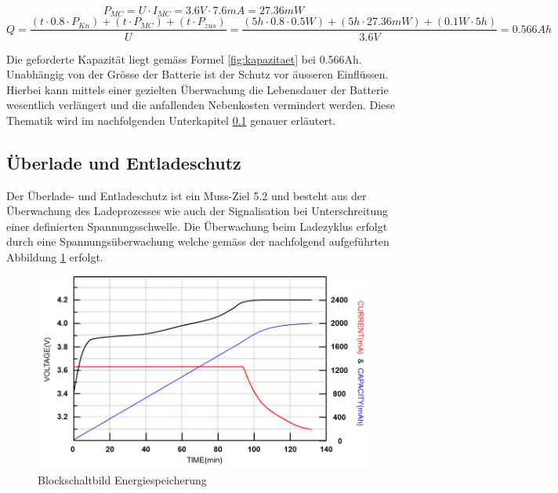 \begin{equation}
P_{MC}=U\cdot I_{MC}=3.6V\cdot 7.6mA=27.36mW
\label{fig:LeistungMC}
\end{equation}
\begin{equation}
Q=\frac{\left(t\cdot 0.8\cdot P_{Kn}\right)+\left(t\cdot P_{MC}\right)+(t\cdot P_{zus})}{U}=\frac{\left(5h\cdot 0.8\cdot 0.5W\right)+\left(5h\cdot 27.36mW\right)+(0.1W\cdot 5h)}{3.6V}=0.566Ah
\label{fig:kapazitaet}
\end{equation}

Die geforderte Kapazität liegt gemäss Formel \ref{fig:kapazitaet} bei 0.566Ah. Unabhängig von der Grösse der Batterie ist der Schutz vor äusseren Einflüssen. Hierbei kann mittels einer gezielten Überwachung die Lebensdauer der Batterie wesentlich verlängert und die anfallenden Nebenkosten vermindert werden. Diese Thematik wird im nachfolgenden Unterkapitel \ref{Überlade und Entladeschutz} genauer erläutert.
                                         
\subsection{Überlade und Entladeschutz}  \label{Überlade und Entladeschutz}

Der Überlade- und Entladeschutz ist ein Muss-Ziel 5.2 und besteht aus der Überwachung des Ladeprozesses wie auch der Signalisation bei Unterschreitung einer definierten Spannungsschwelle. Die Überwachung beim Ladezyklus erfolgt durch eine Spannungsüberwachung welche gemäss der nachfolgend aufgeführten Abbildung \ref{fig:Ladekurve Li-Ion Akku} erfolgt.

\begin{figure}[H]
	\begin{center}
		\includegraphics[width=120mm]{data/LadekurveLiIon.png}
		\caption{Blockschaltbild Energiespeicherung} %
		\label{fig:Ladekurve Li-Ion Akku}
	\end{center}
\end{figure}

